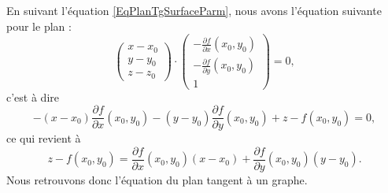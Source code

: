 En suivant l'équation \eqref{EqPlanTgSurfaceParm}, nous avons l'équation suivante pour le plan :
\begin{equation}      
    \begin{pmatrix}
        x-x_0    \\ 
        y-y_0    \\ 
        z-z_0    
    \end{pmatrix}\cdot
    \begin{pmatrix}
        -\frac{ \partial f }{ \partial x }(x_0,y_0)    \\ 
        -\frac{ \partial f }{ \partial y }(x_0,y_0)    \\ 
        1
    \end{pmatrix}=0,
\end{equation}
c'est à dire
\begin{equation}
    -(x-x_0)\frac{ \partial f }{ \partial x }(x_0,y_0)-(y-y_0)\frac{ \partial f }{ \partial y }(x_0,y_0)+z-f(x_0,y_0)=0,
\end{equation}
ce qui revient à
\begin{equation}
    z-f(x_0,y_0)=\frac{ \partial f }{ \partial x }(x_0,y_0)(x-x_0)+\frac{ \partial f }{ \partial y }(x_0,y_0)(y-y_0).
\end{equation}
Nous retrouvons donc l'équation du plan tangent à un graphe.

